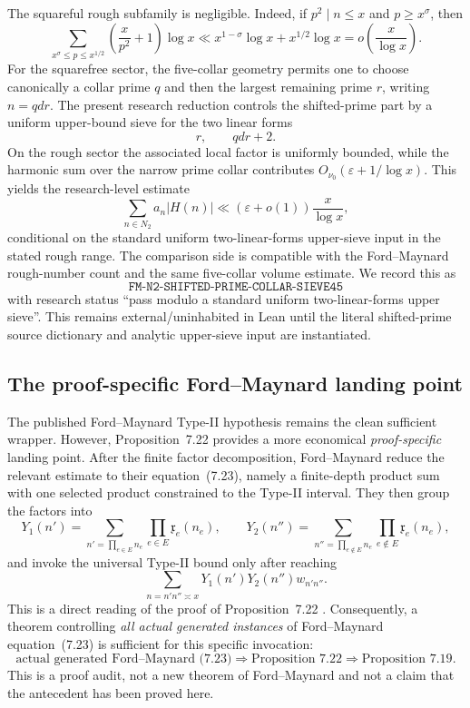 \documentclass[11pt]{article}
\theoremstyle{definition}
\newcommand{\1}{\mathbf 1}
\begin{document}
The squareful rough subfamily is negligible.  Indeed, if $p^2\mid n\le x$
and $p\ge x^\sigma$, then
\begin{equation}
 \sum_{x^\sigma\le p\le x^{1/2}}
 \left(\frac{x}{p^2}+1\right)\log x
 \ll
 x^{1-\sigma}\log x+x^{1/2}\log x
 =o\!\left(\frac{x}{\log x}\right).
 \label{eq:N2-squareful}
\end{equation}
For the squarefree sector, the five-collar geometry permits one to choose
canonically a collar prime $q$ and then the largest remaining prime $r$, writing
$n=qdr$.  The present research reduction controls the shifted-prime part by a
uniform upper-bound sieve for the two linear forms
\[
     r,\qquad qdr+2.
\]
On the rough sector the associated local factor is uniformly bounded, while
the harmonic sum over the narrow prime collar contributes
$O_{\nu_0}(\varepsilon+1/\log x)$.  This yields the research-level estimate
\[
   \sum_{n\in N_2} a_n|H(n)|
   \ll
   \left(\varepsilon+o(1)\right)\frac{x}{\log x},
\]
conditional on the standard uniform two-linear-forms upper-sieve input in the
stated rough range.  The comparison side is compatible with the
Ford--Maynard rough-number count and the same five-collar volume estimate.
We record this as
\[
 \boxed{\texttt{FM-N2-SHIFTED-PRIME-COLLAR-SIEVE45}}
\]
with research status ``pass modulo a standard uniform two-linear-forms upper
sieve''.  This remains external/uninhabited in Lean until the literal shifted-prime
source dictionary and analytic upper-sieve input are instantiated.

\subsection{The proof-specific Ford--Maynard landing point}
The published Ford--Maynard Type-II hypothesis remains the clean sufficient
wrapper.  However, Proposition~7.22 provides a more economical
\emph{proof-specific} landing point.  After the finite factor decomposition,
Ford--Maynard reduce the relevant estimate to their equation~(7.23), namely a
finite-depth product sum with one selected product constrained to the Type-II
interval.  They then group the factors into
\[
   Y_1(n')
   =
   \sum_{n'=\prod_{e\in E}n_e}
      \prod_{e\in E}\mathfrak x_e(n_e),
   \qquad
   Y_2(n'')
   =
   \sum_{n''=\prod_{e\notin E}n_e}
      \prod_{e\notin E}\mathfrak x_e(n_e),
\]
and invoke the universal Type-II bound only after reaching
\[
   \sum_{n=n'n''\asymp x}
      Y_1(n')Y_2(n'')w_{n'n''}.
\]
This is a direct reading of the proof of Proposition~7.22
\cite{FordMaynard2024}.  Consequently, a theorem controlling \emph{all actual
generated instances} of Ford--Maynard equation~(7.23) is sufficient for this
specific invocation:
\[
 \boxed{
 \text{actual generated Ford--Maynard (7.23)}
 \Longrightarrow
 \text{Proposition 7.22}
 \Longrightarrow
 \text{Proposition 7.19}.}
\]
This is a proof audit, not a new theorem of Ford--Maynard and not a claim that
the antecedent has been proved here.
\end{document}
